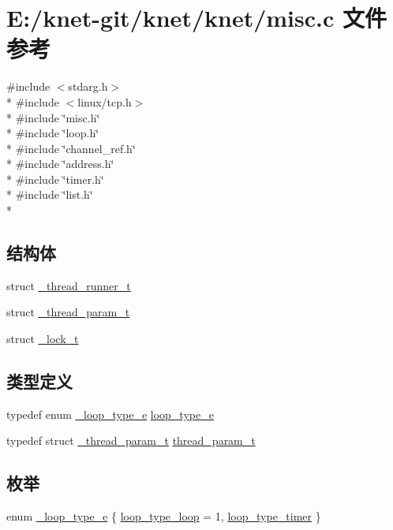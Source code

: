 \hypertarget{a00084}{}\section{E\+:/knet-\/git/knet/knet/misc.c 文件参考}
\label{a00084}
{\ttfamily \#include $<$stdarg.\+h$>$}\\*
{\ttfamily \#include $<$linux/tcp.\+h$>$}\\*
{\ttfamily \#include \char`\"{}misc.\+h\char`\"{}}\\*
{\ttfamily \#include \char`\"{}loop.\+h\char`\"{}}\\*
{\ttfamily \#include \char`\"{}channel\+\_\+ref.\+h\char`\"{}}\\*
{\ttfamily \#include \char`\"{}address.\+h\char`\"{}}\\*
{\ttfamily \#include \char`\"{}timer.\+h\char`\"{}}\\*
{\ttfamily \#include \char`\"{}list.\+h\char`\"{}}\\*
\subsection*{结构体}
\begin{DoxyCompactItemize}
\item 
struct \hyperlink{a00038}{\+\_\+thread\+\_\+runner\+\_\+t}
\item 
struct \hyperlink{a00037}{\+\_\+thread\+\_\+param\+\_\+t}
\item 
struct \hyperlink{a00028}{\+\_\+lock\+\_\+t}
\end{DoxyCompactItemize}
\subsection*{类型定义}
\begin{DoxyCompactItemize}
\item 
typedef enum \hyperlink{a00084_a2583618f1d6afdd0085a96f59b45d9bd_a2583618f1d6afdd0085a96f59b45d9bd}{\+\_\+loop\+\_\+type\+\_\+e} \hyperlink{a00084_a93730d5de4a5f4dbe3013b02b051df62_a93730d5de4a5f4dbe3013b02b051df62}{loop\+\_\+type\+\_\+e}
\item 
typedef struct \hyperlink{a00037}{\+\_\+thread\+\_\+param\+\_\+t} \hyperlink{a00084_aaca514c4c0b391f40ccc7e8c68fd4c21_aaca514c4c0b391f40ccc7e8c68fd4c21}{thread\+\_\+param\+\_\+t}
\end{DoxyCompactItemize}
\subsection*{枚举}
\begin{DoxyCompactItemize}
\item 
enum \hyperlink{a00084_a2583618f1d6afdd0085a96f59b45d9bd_a2583618f1d6afdd0085a96f59b45d9bd}{\+\_\+loop\+\_\+type\+\_\+e} \{ \hyperlink{a00084_a2583618f1d6afdd0085a96f59b45d9bd_a2583618f1d6afdd0085a96f59b45d9bda0451d8a119ce5fe669f2f2b454920dd4}{loop\+\_\+type\+\_\+loop} = 1, 
\hyperlink{a00084_a2583618f1d6afdd0085a96f59b45d9bd_a2583618f1d6afdd0085a96f59b45d9bda6b68505ad966bb72c76dfde12d79938f}{loop\+\_\+type\+\_\+timer}
 \}
\end{DoxyCompactItemize}
